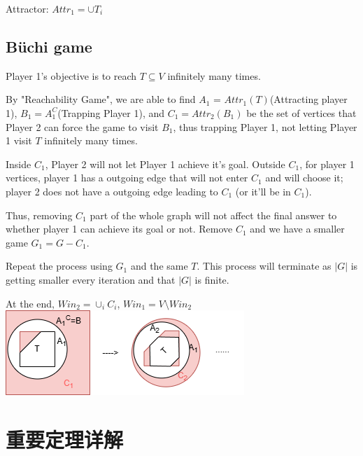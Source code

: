 \documentclass[12pt,a4paper]{ctexrep}
\begin{document}
Attractor: $Attr_1 = \cup T_i$
\subsection{B\"uchi game}
Player 1's objective is to reach $T \subseteq V$ infinitely many times. 

By "Reachability Game", we are able to find $A_1$ = $Attr_1(T)$(Attracting player 1), $B_1 = A_1^C$(Trapping Player 1), and $C_1 = Attr_2(B_1)$ be the set of vertices that Player 2 can force the game to visit $B_1$, thus trapping Player 1, not letting Player 1 visit $T$ infinitely many times.

Inside $C_1$, Player 2 will not let Player 1 achieve it's goal. Outside $C_1$, for player 1 vertices, player 1 has a outgoing edge that will not enter $C_1$ and will choose it; player 2 does not have a outgoing edge leading to $C_1$ (or it'll be in $C_1$).

Thus, removing $C_1$ part of the whole graph will not affect the final answer to whether player 1 can achieve its goal or not. Remove $C_1$ and we have a smaller game $G_1 = G - C_1$.

Repeat the process using $G_1$ and the same $T$. This process will terminate as $|G|$ is getting smaller every iteration and that $|G|$ is finite.

At the end, $Win_2 = \cup_i C_i$, $Win_1 = V \setminus Win_2$\\

\centering
\includegraphics[scale=0.5]{buchi_game.png}
\section{重要定理详解}
\end{document}
